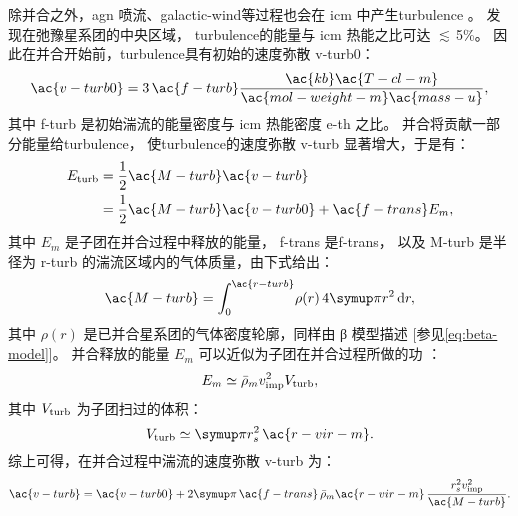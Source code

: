 除并合之外，\ac{agn} 喷流、\ac{galactic-wind}等过程也会在 \ac{icm}
中产生\ac{turbulence} \cite{vazza2011}。
 发现在弛豫星系团的中央区域，
\ac{turbulence}的能量与 \ac{icm} 热能之比可达 $\lesssim\,$5\%。
因此在并合开始前，\ac{turbulence}具有初始的速度弥散 \ac{v-turb0}：
\begin{equation}
  \label{eq:v-turb0}
  \ac{v-turb0}
    = 3 \,\ac{f-turb} \frac{\ac{kb} \ac{T-cl-m}}{
        \ac{mol-weight-m} \ac{mass-u}} ,
\end{equation}
其中
\ac{f-turb} 是初始湍流的能量密度与 \ac{icm} 热能密度 \ac{e-th} 之比。
并合将贡献一部分能量给\ac{turbulence}，
使\ac{turbulence}的速度弥散 \ac{v-turb} 显著增大，于是有：
\begin{align}
  \label{eq:energy-turb}
  E_{\R{turb}}
    & = \frac{1}{2} \ac{M-turb} \ac{v-turb}  \\
    & = \frac{1}{2} \ac{M-turb} \ac{v-turb0} + \ac{f-trans} E_m ,
\end{align}
其中
$E_m$ 是子团在并合过程中释放的能量，
\ac{f-trans} 是\acl{f-trans}，
以及 \ac{M-turb} 是半径为 \ac{r-turb} 的湍流区域内的气体质量，由下式给出：
\begin{equation}
  \ac{M-turb} = \int_0^{\ac{r-turb}} \! \rho(r) \,4\Cpi r^2 \,\D{r} ,
\end{equation}
其中 $\rho(r)$ 是已并合星系团的气体密度轮廓，同样由 β 模型描述
[参见\autoref{eq:beta-model}]。
并合释放的能量 $E_m$ 可以近似为子团在并合过程所做的功 \cite{fujita2003,cassano2005}：
\begin{equation}
  \label{eq:energy-inj}
  E_m \simeq \bar{\rho}_m v_{\mathrm{imp}}^2 V_{\mathrm{turb}} ,
\end{equation}
其中 $V_{\mathrm{turb}}$ 为子团扫过的体积：
\begin{equation}
  V_{\R{turb}} \simeq \Cpi r_s^2 \,\ac{r-vir-m} .
\end{equation}
综上可得，在并合过程中湍流的速度弥散 \ac{v-turb} 为：
\begin{equation}
  \ac{v-turb}
    = \ac{v-turb0}
    + 2 \Cpi\,\ac{f-trans}\, \bar{\rho}_m \ac{r-vir-m}
      \,\frac{r_s^2 v_{\R{imp}}^2}{\ac{M-turb}} .
\end{equation}

